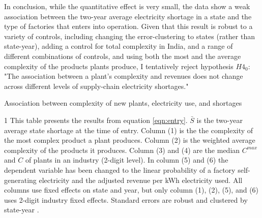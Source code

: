 \documentclass[11pt]{article}
\begin{document}
In conclusion, while the quantitative effect is very small, the data show a weak association between the two-year average electricity shortage in a state and the type of factories that enters into operation. Given that this result is robust to a variety of controls, including changing the error-clustering to states (rather than state-year), adding a control for total complexity in India, and a range of different combinations of controls, and using both the most and the average complexity of the products plants produce, I tentatively reject hypothesis $H4_0$: "The association between a plant's complexity and revenues does not change across different levels of supply-chain electricity shortages."




\begin{table} 
	\begin{center}
		\begin{threeparttable}
			\caption{Association between complexity of new plants, electricity use, and shortages}
			\label{tab:entry_min}
			
			\begin{tablenotes} \footnotesize 
			\item[1] This table presents the results from equation \ref{eqn:entry}. $\bar{S}$ is the two-year average state shortage at the time of entry. Column (1) is the the complexity of the most complex product a plant produces. Column (2) is the weighted average complexity of the products it produces. Column (3) and (4) are the median $C^{max}$ and $C$ of plants in an industry (2-digit level). In column (5) and (6) the dependent variable has been changed to the linear probability of a factory self-generating electricity and the adjusted revenue per kWh electricity used. All columns use fixed effects on state and year, but only column (1), (2), (5), and (6) uses 2-digit industry fixed effects. Standard errors are robust and clustered by state-year .
			\end{tablenotes}
		\end{threeparttable}
	\end{center}
\end{table}   
\end{document}

